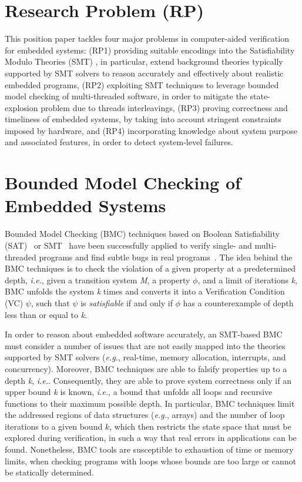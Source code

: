 \documentclass{acm_sen_article}
\begin{document}
\section{Research Problem (RP)}

This position paper tackles four major problems in computer-aided verification for embedded systems: (RP1) providing suitable encodings into the Satisfiability Modulo Theories (SMT) \cite{BarrettSST09}, in particular, extend background theories typically supported by SMT solvers to reason accurately and effectively about realistic embedded programs, (RP2) exploiting SMT techniques to leverage bounded model checking of multi-threaded software, in order to mitigate the state-explosion problem due to threads interleavings, (RP3) proving correctness and timeliness of embedded systems, by taking into account stringent constraints imposed by hardware, and (RP4) incorporating knowledge about system purpose and associated features, in order to detect system-level failures.

\section{Bounded Model Checking of Embedded Systems}

Bounded Model Checking (BMC) techniques based on Boolean Satisfiability (SAT)~\cite{handbook09} or SMT~\cite{BarrettSST09} have been successfully applied to verify single- and multi-threaded programs and find subtle bugs in real programs~\cite{Clarke04,MerzFS12,CordeiroF11,Ivancic05,Cordeiro12}. The idea behind the BMC techniques is to check the violation of a given property at a predetermined depth, {\it i.e.}, given a transition system \textit{M}, a property $ \phi $, and a limit of iterations \textit{k}, BMC unfolds the system \textit{k} times and converts it into a Verification Condition (VC) $ \psi $, such that $\psi$ is \textit{satisfiable} if and only if $\phi$ has a counterexample of depth
less than or equal to \textit{k}.

In order to reason about embedded software accurately, an SMT-based BMC must consider a number of issues that are not easily mapped into the theories supported by SMT solvers ({\it e.g.}, real-time, memory allocation, interrupts, and concurrency). Moreover, BMC techniques are able to falsify properties up to a depth \textit{k}, {\it i.e.}. Consequently, they are able to prove system correctness only if an upper bound \textit{k} is known, {\it i.e.}, a bound that unfolds all loops and recursive functions to their maximum possible depth. In particular, BMC techniques limit the addressed regions of data structures ({\it e.g.}, arrays) and the number of loop iterations to a given bound $k$, which then restricts the state space that must be explored during verification, in such a way that real errors in applications \cite{Clarke04,MerzFS12,Ivancic05,Cordeiro12} can be found. Nonetheless, BMC tools are susceptible to exhaustion of time or memory limits, when checking programs with loops whose bounds are too large or cannot be statically determined.  
\end{document}
